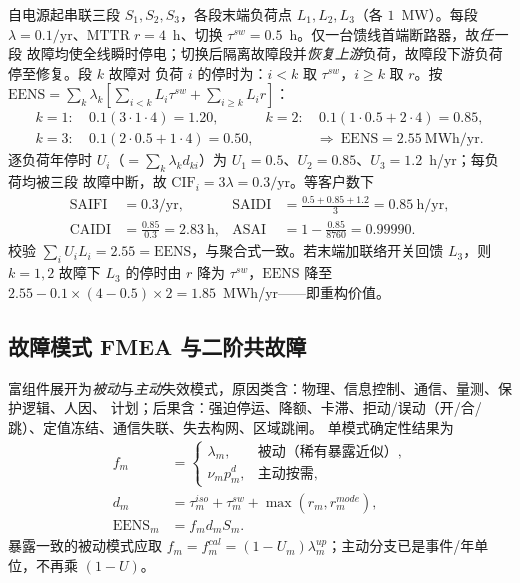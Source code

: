 \begin{example}\label{ex:rel-fa-feeder}
自电源起串联三段 $S_1,S_2,S_3$，各段末端负荷点 $L_1,L_2,L_3$（各 $1$~MW）。每段
$\lambda=0.1/\text{yr}$、$\mathrm{MTTR}\;r=4$~h、切换 $\tau^{sw}=0.5$~h。仅一台馈线首端断路器，故\emph{任一}段
故障均使全线瞬时停电；切换后隔离故障段并\emph{恢复上游}负荷，故障段下游负荷停至修复。段 $k$ 故障对
负荷 $i$ 的停时为：$i<k$ 取 $\tau^{sw}$，$i\ge k$ 取 $r$。按 $\mathrm{EENS}=\sum_k\lambda_k[\sum_{i<k}L_i\tau^{sw}+\sum_{i\ge k}L_ir]$：
\begin{align*}
 k{=}1:&\ 0.1(3{\cdot}1{\cdot}4)=1.20, & k{=}2:&\ 0.1(1{\cdot}0.5+2{\cdot}4)=0.85,\\
 k{=}3:&\ 0.1(2{\cdot}0.5+1{\cdot}4)=0.50, & &\Rightarrow\ \mathrm{EENS}=2.55~\text{MWh/yr}.
\end{align*}
逐负荷年停时 $U_i$（$=\sum_k\lambda_k d_{ki}$）为 $U_1{=}0.5$、$U_2{=}0.85$、$U_3{=}1.2$~h/yr；每负荷均被三段
故障中断，故 $\mathrm{CIF}_i=3\lambda=0.3/\text{yr}$。等客户数下
\begin{align*}
 \mathrm{SAIFI}&=0.3/\text{yr}, & \mathrm{SAIDI}&=\tfrac{0.5+0.85+1.2}{3}=0.85~\text{h/yr},\\
 \mathrm{CAIDI}&=\tfrac{0.85}{0.3}=2.83~\text{h}, & \mathrm{ASAI}&=1-\tfrac{0.85}{8760}=0.99990.
\end{align*}
校验 $\sum_iU_iL_i=2.55=\mathrm{EENS}$，与聚合式一致。若末端加联络开关回馈 $L_3$，则 $k{=}1,2$ 故障下 $L_3$
的停时由 $r$ 降为 $\tau^{sw}$，$\mathrm{EENS}$ 降至 $2.55-0.1{\times}(4{-}0.5){\times}2=1.85$~MWh/yr——即重构价值。
\end{example}

\subsection{故障模式 FMEA 与二阶共故障}\label{sec:rel-fa-mode}
富组件展开为\emph{被动}与\emph{主动}失效模式，原因类含：物理、信息控制、通信、量测、保护逻辑、人因、
计划；后果含：强迫停运、降额、卡滞、拒动/误动（开/合/跳）、定值冻结、通信失联、失去构网、区域跳闸。
单模式确定性结果为
\begin{equation}
\begin{aligned}
 f_m&=\begin{cases}\lambda_m,&\text{被动（稀有暴露近似）},\\
 \nu_m p_m^d,&\text{主动按需},\end{cases}\\
 d_m&=\tau_m^{iso}+\tau_m^{sw}+\max(r_m,r_m^{mode}),\\
 \mathrm{EENS}_m&=f_m d_m S_m.
\end{aligned}
 \label{eq:rel-fa-mode}
\end{equation}
暴露一致的被动模式应取 $f_m=f_m^{cal}=(1-U_m)\lambda_m^{up}$；主动分支已是事件/年单位，不再乘 $(1-U)$。


